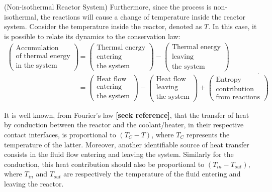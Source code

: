 \documentclass[a4paper,11pt]{book}
\numberwithin{figure}{chapter}
\numberwithin{equation}{chapter}
\numberwithin{table}{chapter}
\theoremstyle{definition}
\newtheorem{example}{Example}[chapter]
\newcounter{boxed-theorem}
\newcounter{boxed-definition}
\newcounter{boxed-example}
\newenvironment{boxed-example}[1]
{\colorlet{shadecolor}{pastelRed!20} \begin{shaded} \begin{example}{#1}}
{\end{example} \end{shaded}}
\begin{document}
\begin{boxed-example}{(Non-isothermal Reactor System)}
    Furthermore, since the process is non-isothermal, the reactions will cause a change of temperature inside the reactor system. Consider the temperature inside the reactor, denoted as $T$. In this case, it is possible to relate its dynamics to the conservation law:  
    \begin{equation}
    \begin{split}
        \begin{pmatrix}
            \text{Accumulation} \\ \text{of thermal energy} \\ \text{in the system}
        \end{pmatrix} &= \begin{pmatrix}
            \text{Thermal energy} \\ \text{entering} \\ \text{the system}
        \end{pmatrix} - \begin{pmatrix}
            \text{Thermal energy} \\ \text{leaving} \\ \text{the system}
        \end{pmatrix} \\
         &= \begin{pmatrix}
            \text{Heat flow} \\ \text{entering} \\ \text{the system}
        \end{pmatrix} - \begin{pmatrix}
            \text{Heat flow} \\ \text{leaving} \\ \text{the system}
        \end{pmatrix} + \begin{pmatrix}
            \text{Entropy} \\ \text{contribution} \\ \text{from reactions}
        \end{pmatrix}
    \end{split}
    .\end{equation}
    
    It is well known, from Fourier's law \textbf{[seek reference]}, that the transfer of heat by conduction between the reactor and the coolant/heater, in their respective contact interfaces, is proportional to $(T_C - T)$, where $T_C$ represents the temperature of the latter. Moreover, another identifiable source of heat transfer consists in the fluid flow entering and leaving the system. Similarly for the conduction, this heat contribution should also be proportional to $(T_{in} - T_{out})$, where $T_{in}$ and $T_{out}$ are respectively the temperature of the fluid entering and leaving the reactor.
    

\end{boxed-example}
\end{document}
